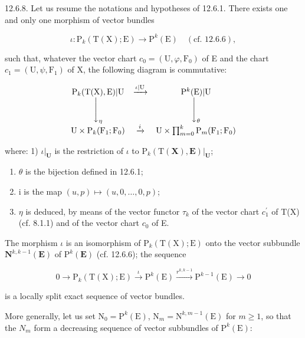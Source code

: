 12.6.8. Let us resume the notations and hypotheses of 12.6.1. There exists one and only one morphism of vector bundles

\[
\iota\colon\mathrm{P}_{k}(\mathrm{T}(\mathrm{X});\mathrm{E})\rightarrow\mathrm{P}^{k}(\mathrm{E})\quad(\text{cf. 12.6.6}),
\]

such that, whatever the vector chart \(c_{0} = (\mathrm{U}, \varphi, \mathrm{F}_{0})\) of E and the chart \(c_{1} = (\mathrm{U}, \psi, \mathrm{F}_{1})\) of X, the following diagram is commutative:

\[
\begin{array}{c c c} \mathrm{P} _ {k} (\mathrm{T} (\mathrm{X}), \mathrm{E}) | \mathrm{U} & \xrightarrow {\iota | \mathrm{U}} & \mathrm{P} ^ {k} (\mathrm{E}) | \mathrm{U} \\ \Biggl \downarrow_ {\eta} & & \Biggl \downarrow_ {\theta} \\ \mathrm{U} \times \mathrm{P} _ {k} (\mathrm{F} _ {1}; \mathrm{F} _ {0}) & \xrightarrow {i} & \mathrm{U} \times \prod_ {m = 0} ^ {k} \mathrm{P} _ {m} (\mathrm{F} _ {1}; \mathrm{F} _ {0}) \end{array}
\]

where: 1) \(\iota|_{\mathbf{U}}\) is the restriction of \(\iota\) to \(\mathrm{P}_{k}(\mathrm{T}(\mathbf{X}),\mathbf{E})|_{\mathbf{U}}\);

\begin{enumerate}
\def\labelenumi{\arabic{enumi})}
\setcounter{enumi}{1}
\item
  \(\theta\) is the bijection defined in 12.6.1;
\item
  i is the map \((u, p) \mapsto (u, 0, \ldots, 0, p)\);
\item
  \(\eta\) is deduced, by means of the vector functor \(\tau_{k}\) of the vector chart \(c_{1}^{\prime}\) of T(X) (cf. 8.1.1) and of the vector chart \(c_{0}\) of E.
\end{enumerate}

The morphism \(\iota\) is an isomorphism of \(\mathrm{P}_{k}(\mathrm{T}(\mathrm{X});\mathrm{E})\) onto the vector subbundle \(\mathbf{N}^{k,k - 1}(\mathbf{E})\) of \(\mathrm{P}^k (\mathbf{E})\) (cf. 12.6.6); the sequence

\[
0 \rightarrow \mathrm{P}_{k}(\mathrm{T}(\mathrm{X});\mathrm{E}) \xrightarrow {\iota} \mathrm{P}^{k}(\mathrm{E}) \xrightarrow {r^{k,k-1}} \mathrm{P}^{k-1}(\mathrm{E}) \rightarrow 0
\]

is a locally split exact sequence of vector bundles.

More generally, let us set \(\mathrm{N}_{0}=\mathrm{P}^{k}(\mathrm{E})\), \(\mathrm{N}_{m}=\mathrm{N}^{k,m-1}(\mathrm{E})\) for \(m\geqslant1\), so that the \(N_{m}\) form a decreasing sequence of vector subbundles of \(\mathrm{P}^{k}(\mathrm{E})\):

